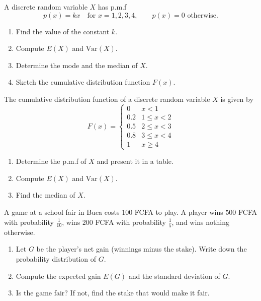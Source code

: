\documentclass[11pt]{article}
\newcounter{popsec}
\newcounter{popsub}
\newcommand{\courssub}[1]{%
  \stepcounter{popsub}%
  \par\vspace{9pt}\noindent{\popxbold\fontsize{11.5}{13}\selectfont\color{popink}{\color{poporange}\thepopsec.\thepopsub}\hspace{6pt}#1}\par\nopagebreak\vspace{4pt}
}
\begin{document}
\courssub{I practise}

\begin{exercice}
A discrete random variable $X$ has p.m.f
\[ p(x) = kx \quad \text{for } x = 1, 2, 3, 4, \qquad p(x) = 0 \text{ otherwise.} \]
\begin{enumerate}
\item Find the value of the constant $k$.
\item Compute $E(X)$ and $\mathrm{Var}(X)$.
\item Determine the mode and the median of $X$.
\item Sketch the cumulative distribution function $F(x)$.
\end{enumerate}
\end{exercice}

\begin{exercice}
The cumulative distribution function of a discrete random variable $X$ is given by
\[ F(x) = \begin{cases} 0 & x < 1 \\ 0.2 & 1 \le x < 2 \\ 0.5 & 2 \le x < 3 \\ 0.8 & 3 \le x < 4 \\ 1 & x \ge 4 \end{cases} \]
\begin{enumerate}
\item Determine the p.m.f of $X$ and present it in a table.
\item Compute $E(X)$ and $\mathrm{Var}(X)$.
\item Find the median of $X$.
\end{enumerate}
\end{exercice}

\begin{exercice}
A game at a school fair in Buea costs $100$ FCFA to play. A player wins $500$ FCFA with probability $\tfrac{1}{10}$, wins $200$ FCFA with probability $\tfrac{1}{5}$, and wins nothing otherwise.
\begin{enumerate}
\item Let $G$ be the player's net gain (winnings minus the stake). Write down the probability distribution of $G$.
\item Compute the expected gain $E(G)$ and the standard deviation of $G$.
\item Is the game fair? If not, find the stake that would make it fair.
\end{enumerate}
\end{exercice}
\end{document}
